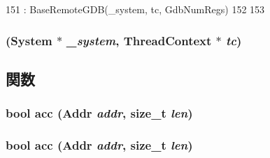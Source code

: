\begin{DoxyCode}
151     : BaseRemoteGDB(_system, tc, GdbNumRegs)
152 {
153 }
\end{DoxyCode}
\hypertarget{classMipsISA_1_1RemoteGDB_a378793e7a68420568b51f355b7e8c473}{
\subsubsection[{RemoteGDB}]{ ({\bf System} $\ast$ {\em \_\-system}, \/  {\bf ThreadContext} $\ast$ {\em tc})}}
\label{classMipsISA_1_1RemoteGDB_a378793e7a68420568b51f355b7e8c473}


\subsection{関数}
\hypertarget{classMipsISA_1_1RemoteGDB_ac4c7be164f087f2f53d137d9768809a7}{
\subsubsection[{acc}]{\setlength{\rightskip}{0pt plus 5cm}bool acc ({\bf Addr} {\em addr}, \/  size\_\-t {\em len})}}
\label{classMipsISA_1_1RemoteGDB_ac4c7be164f087f2f53d137d9768809a7}
\hypertarget{classMipsISA_1_1RemoteGDB_ac4c7be164f087f2f53d137d9768809a7}{
\subsubsection[{acc}]{\setlength{\rightskip}{0pt plus 5cm}bool acc ({\bf Addr} {\em addr}, \/  size\_\-t {\em len})}}
\label{classMipsISA_1_1RemoteGDB_ac4c7be164f087f2f53d137d9768809a7}



